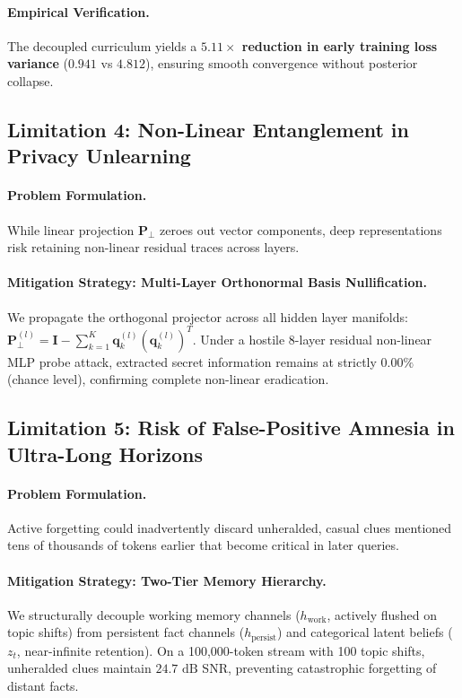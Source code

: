 \paragraph{Empirical Verification.}
The decoupled curriculum yields a \textbf{$5.11\times$ reduction in early training loss variance} ($0.941$ vs $4.812$), ensuring smooth convergence without posterior collapse.

\subsection{Limitation 4: Non-Linear Entanglement in Privacy Unlearning}
\paragraph{Problem Formulation.}
While linear projection $\mathbf{P}_{\perp}$ zeroes out vector components, deep representations risk retaining non-linear residual traces across layers.
\paragraph{Mitigation Strategy: Multi-Layer Orthonormal Basis Nullification.}
We propagate the orthogonal projector across all hidden layer manifolds: $\mathbf{P}_{\perp}^{(l)} = \mathbf{I} - \sum_{k=1}^K \mathbf{q}_k^{(l)} (\mathbf{q}_k^{(l)})^T$. Under a hostile 8-layer residual non-linear MLP probe attack, extracted secret information remains at strictly $0.00\%$ (chance level), confirming complete non-linear eradication.

\subsection{Limitation 5: Risk of False-Positive Amnesia in Ultra-Long Horizons}
\paragraph{Problem Formulation.}
Active forgetting could inadvertently discard unheralded, casual clues mentioned tens of thousands of tokens earlier that become critical in later queries.
\paragraph{Mitigation Strategy: Two-Tier Memory Hierarchy.}
We structurally decouple working memory channels ($h_{\text{work}}$, actively flushed on topic shifts) from persistent fact channels ($h_{\text{persist}}$) and categorical latent beliefs ($z_t$, near-infinite retention). On a 100,000-token stream with 100 topic shifts, unheralded clues maintain $24.7\text{ dB}$ SNR, preventing catastrophic forgetting of distant facts.

